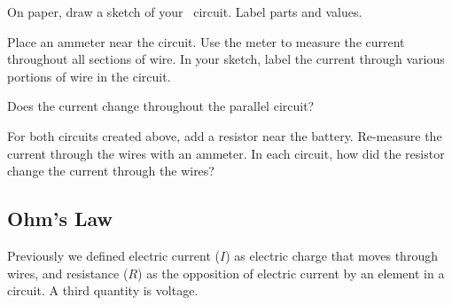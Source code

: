 \documentclass[main.tex]{subfiles}
\begin{document}
\begin{exercise}
    On paper, draw a sketch of your \phet\ circuit. Label parts and values. 
\end{exercise}

\begin{exercise}
    Place an ammeter near the circuit. Use the meter to measure the current throughout all sections of wire. In your sketch, label the current through various portions of wire in the circuit.
\end{exercise}

\begin{exercise}
    Does the current change throughout the parallel circuit?
\end{exercise}

\begin{exercise}
    For both circuits created above, add a resistor near the battery. Re-measure the current through the wires with an ammeter. In each circuit, how did the resistor change the current through the wires?
\end{exercise}



\clearpage

\subsection{Ohm's Law} \label{nJeAQY}

Previously we defined \gls{electric current} ($I$) as electric charge that moves through wires, and \gls{resistance} ($R$) as the opposition of electric current by an element in a circuit. A third quantity is voltage.
\end{document}

